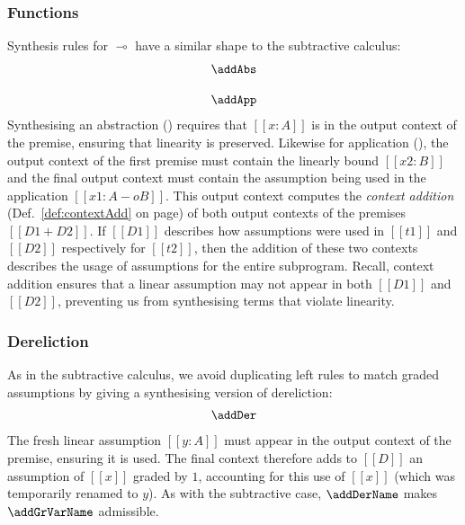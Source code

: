 \subsubsection{Functions}
Synthesis rules for $\multimap$ have a similar shape to the
subtractive calculus:
%
\begin{align*}
\begin{array}{c}
\addAbs
\\[1.25em]
\addApp
\end{array}
\end{align*}
%
Synthesising an abstraction (\addAbsName) requires that $[[x : A]]$ is in the
output context of the premise, ensuring that linearity is preserved. Likewise
for application (\addAppName), the output context of the first premise must
contain the linearly bound $[[x2 : B]]$ and the final output context must
contain the assumption being used in the application $[[ x1 : A -o B ]]$. This
output context computes the \emph{context addition} (Def.~\ref{def:contextAdd}
on page\pageref{def:contextAdd}) of both output contexts of the premises $[[D1 +
D2]]$. If $[[D1]]$ describes how assumptions were used in $[[t1]]$ and $[[D2]]$
respectively for $[[t2]]$, then the addition of these two contexts describes the
usage of assumptions for the entire subprogram. Recall, context addition ensures
that a linear assumption may not appear in both $[[D1]]$ and $[[D2]]$,
preventing us from synthesising terms that violate linearity.



\subsubsection{Dereliction}
As in the subtractive calculus,
we avoid duplicating left rules to
match graded assumptions by giving a synthesising version of dereliction:
\begin{align*}
  \addDer
  \end{align*}
%
The fresh linear assumption $[[ y : A ]]$ must
appear in the output context of the premise, ensuring it is used. The final
context therefore adds to $[[ D ]]$ an assumption of $[[x]]$ graded by
$1$, accounting for this use of $[[ x ]]$ (which was temporarily renamed to
$y$).
As with the subtractive case, $\addDerName$ makes $\addGrVarName$ admissible. 

